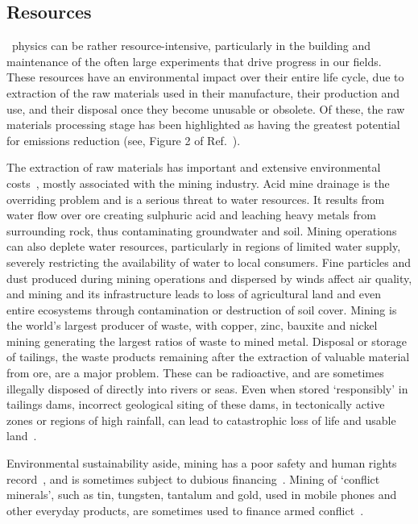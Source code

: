 \documentclass[../SustainableHEP.tex]{subfiles}
\begin{document}
\subsection{Resources}
\label{subsec:Resources}

\ACR\ physics can be rather resource-intensive, particularly in the building and maintenance of the often large experiments that drive progress in our fields.  These resources have an environmental impact over their entire life cycle, due to extraction of the raw materials used in their manufacture, their production and use, and their disposal once they become unusable or obsolete. Of these, the raw materials processing stage has been highlighted as having the greatest potential for emissions reduction (see, \eg Figure 2 of Ref.~\cite{EURaw}).  

The extraction of raw materials has important and extensive environmental costs~\cite{Dolega:2016}, mostly associated with the mining industry.  Acid mine drainage is the overriding problem and is a serious threat to water resources.  It results from water flow over ore creating sulphuric acid and leaching heavy metals from surrounding rock, thus contaminating groundwater and soil.  Mining operations can also deplete water resources, particularly in regions of limited water supply, severely restricting the availability of water to local consumers.  Fine particles and dust produced during mining operations and dispersed by winds affect air quality, and mining and its infrastructure leads to loss of agricultural land and even entire ecosystems through contamination or destruction of soil cover. Mining is the world's largest producer of waste, with copper, zinc, bauxite and nickel mining generating the largest ratios of waste to mined metal.  Disposal or storage of tailings, the waste products remaining after the extraction of valuable material from ore, are a major problem. These can be radioactive, and are sometimes illegally disposed of directly into rivers or seas.  Even when stored `responsibly' in tailings dams, incorrect geological siting of these dams, in tectonically active zones or regions of high rainfall, can lead to catastrophic loss of life and usable land~\cite{SILVAROTTA2020102119}.

Environmental sustainability aside, mining has a poor safety and human rights record~\cite{ResponsibleMiningIndex}, and is sometimes subject to dubious financing~\cite{MiningandMoneyLaundering}.  Mining of `conflict minerals', such as tin, tungsten, tantalum and gold, used in mobile phones and other everyday products, are sometimes used to finance armed conflict~\cite{EUConflictMinerals}.  
\end{document}
